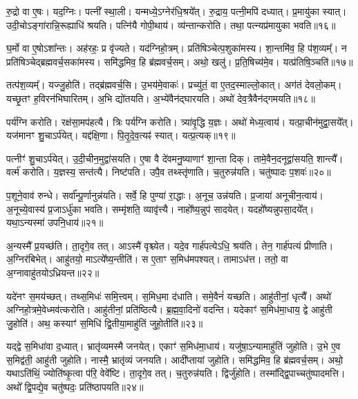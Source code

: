 रु॒द्रो वा ए॒षः।
यद॒ग्निः।
पत्नी᳚ स्था॒ली।
यन्मध्ये॒\-ऽग्नेर॑धि॒श्रये᳚त्।
रु॒द्राय॒ पत्नी॒मपि॑ दध्यात्।
प्र॒मायु॑का स्यात्।
उदी॒चो\-ऽङ्गा॑रान्नि॒रूह्याधि॑ श्रयति।
पत्नि॑यै गोपी॒थाय॑।
व्य॑न्तान्करोति।
तथा॒ पत्न्यप्र॑मायुका भवति॥१६॥

घ॒र्मो वा ए॒षो\-ऽशा᳚न्तः।
अह॑रहः॒ प्र वृ॑ज्यते।
यद॑ग्निहो॒त्रम्।
प्रति॑\-षिञ्चेत्प॒शुका॑मस्य।
शा॒न्तमि॑व॒ हि प॑श॒व्यम्᳚।
न प्रति॑\-षिञ्चेद्ब्रह्मवर्च॒सका॑मस्य।
समि॑द्धमिव॒ हि ब्र॑ह्म\-वर्च॒सम्।
अथो॒ खलु॑।
प्र॒ति॒षिच्य॑मे॒व।
यत्प्र॑तिषि॒ञ्चति॑॥१७॥

तत्प॑श॒व्यम्᳚।
यज्जु॒होति॑।
तद्ब्र॑ह्म\-वर्च॒सि।
उ॒भय॑मे॒वाकः॑।
प्रच्यु॑तं॒ वा ए॒तद॒स्माल्लो॒कात्।
अग॑तं देवलो॒कम्।
यच्छृ॒तꣳ ह॒विरन॑भिघारितम्।
अ॒भि द्यो॑तयति।
अ॒भ्ये॑वैन॑द्\mbox{}घारयति।
अथो॑ देव॒त्रैवैन॑द्गमयति॥१८॥

पर्य॑ग्नि करोति।
रक्ष॑सा॒मप॑हत्यै।
त्रिः पर्य॑ग्नि करोति।
त्र्या॑वृ॒द्धि य॒ज्ञः।
अथो॑ मेध्य॒त्वाय॑।
यत्प्रा॒चीन॑मुद्वा॒सये᳚त्।
यज॑मानꣳ शु॒चा\-ऽर्प॑येत्।
यद्द॑क्षि॒णा।
पि॒तृ॒दे॒व॒त्यꣴ॑ स्यात्।
यत्प्र॒त्यक्॥१९॥

पत्नीꣳ॑ शु॒चा\-ऽर्प॑येत्।
उ॒दी॒चीन॒मुद्वा॑सयति।
ए॒षा वै दे॑वमनु॒ष्याणाꣳ॑ शा॒न्ता दिक्।
तामे॒वैन॒दनूद्वा॑सयति॒ शान्त्यै᳚।
वर्त्म॑ करोति।
य॒ज्ञस्य॒ सन्त॑त्यै।
निष्ट॑पति।
उपै॒व तथ्स्तृ॑णाति।
च॒तुरुन्न॑यति।
चतु॑ष्पादः प॒शवः॑॥२०॥

प॒शूने॒वाव॑ रुन्धे।
सर्वा᳚न्पू॒र्णानुन्न॑यति।
सर्वे॒ हि पुण्या॑ रा॒द्धाः।
अ॒नूच॒ उन्न॑यति।
प्र॒जाया॑ अनूचीन॒त्वाय॑।
अ॒नूच्ये॒वास्य॑ प्र॒जा\-ऽर्धु॑का भवति।
सम्मृ॑शति॒ व्यावृ॑त्त्यै।
नाहो᳚ष्य॒न्नुप॑ सादयेत्।
यदहो᳚ष्यन्नुपसा॒दये᳚त्।
यथा॒ऽन्यस्मा॑ उपनि॒धाय॑॥२१॥

अ॒न्यस्मै᳚ प्र॒यच्छ॑ति।
ता॒दृगे॒व तत्।
आऽस्मै॑ वृश्च्येत।
यदे॒व गार्\mbox{}ह॑पत्येऽधि॒ श्रय॑ति।
तेन॒ गार्\mbox{}ह॑पत्यं प्रीणाति।
अ॒ग्निर॑बिभेत्।
आहु॑तयो॒ माऽत्ये᳚ष्य॒न्तीति॑।
स ए॒ताꣳ स॒मिध॑मपश्यत्।
तामाऽध॑त्त।
ततो॒ वा अ॒ग्नावाहु॑तयो\-ऽध्रियन्त॥२२॥

यदे॑नꣳ स॒मय॑च्छत्।
तथ्स॒मिधः॑ समि॒त्त्वम्।
स॒मिध॒मा द॑धाति।
समे॒वैनं॑ यच्छति।
आहु॑तीनां॒ धृत्यै᳚।
अथो॑ अग्निहो॒त्रमे॒वेध्मव॑त्करोति।
आहु॑तीनां॒ प्रति॑\-ष्ठित्यै।
ब्र॒ह्म॒वा॒दिनो॑ वदन्ति।
यदेकाꣳ॑ स॒मिध॑मा॒धाय॒ द्वे आहु॑ती जु॒होति॑।
अथ॒ कस्याꣳ॑ स॒मिधि॑ द्वि॒तीया॒माहु॑तिं जुहो॒तीति॑॥२३॥

यद्द्वे स॒मिधा॑वा द॒ध्यात्।
भ्रातृ॑व्यमस्मै जनयेत्।
एकाꣳ॑ स॒मिध॑मा॒धाय॑।
यजु॑षा॒\-ऽन्यामाहु॑तिं जुहोति।
उ॒भे ए॒व स॒मिद्व॑ती॒ आहु॑ती जुहोति।
नास्मै॒ भ्रातृ॑व्यं जनयति।
आदी᳚प्तायां जुहोति।
समि॑द्धमिव॒ हि ब्र॑ह्म\-वर्च॒सम्।
अथो॒ यथा\-ऽति॑थिं॒ ज्योति॑ष्कृ॒त्वा प॑रि॒ वेवे᳚ष्टि।
ता॒दृगे॒व तत्।
च॒तुरुन्न॑यति।
द्विर्जु॑होति।
तस्मा᳚द्द्वि॒पाच्चतु॑ष्पादमत्ति।
अथो᳚ द्वि॒पद्ये॒व चतु॑ष्पदः॒ प्रति॑\-ष्ठापयति॥२४॥

